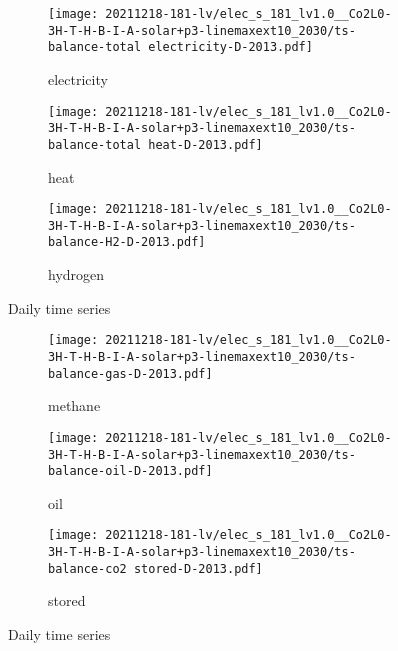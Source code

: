 \begin{figure}
    \centering
    \begin{subfigure}[t]{\textwidth}
        \centering
        \caption{electricity}
        \texttt{[image: 20211218-181-lv/elec\_s\_181\_lv1.0\_\_Co2L0-3H-T-H-B-I-A-solar+p3-linemaxext10\_2030/ts-balance-total electricity-D-2013.pdf]}
    \end{subfigure}
    \begin{subfigure}[t]{\textwidth}
        \centering
        \caption{heat}
        \texttt{[image: 20211218-181-lv/elec\_s\_181\_lv1.0\_\_Co2L0-3H-T-H-B-I-A-solar+p3-linemaxext10\_2030/ts-balance-total heat-D-2013.pdf]}
    \end{subfigure}
    \begin{subfigure}[t]{\textwidth}
        \centering
        \caption{hydrogen}
        \texttt{[image: 20211218-181-lv/elec\_s\_181\_lv1.0\_\_Co2L0-3H-T-H-B-I-A-solar+p3-linemaxext10\_2030/ts-balance-H2-D-2013.pdf]}
    \end{subfigure}
    \caption{Daily time series}
    \label{fig:eligibility}
\end{figure}

\begin{figure}
    \centering
    \begin{subfigure}[t]{\textwidth}
        \centering
        \caption{methane}
        \texttt{[image: 20211218-181-lv/elec\_s\_181\_lv1.0\_\_Co2L0-3H-T-H-B-I-A-solar+p3-linemaxext10\_2030/ts-balance-gas-D-2013.pdf]}
    \end{subfigure}
    \begin{subfigure}[t]{\textwidth}
        \centering
        \caption{oil}
        \texttt{[image: 20211218-181-lv/elec\_s\_181\_lv1.0\_\_Co2L0-3H-T-H-B-I-A-solar+p3-linemaxext10\_2030/ts-balance-oil-D-2013.pdf]}
    \end{subfigure}
    \begin{subfigure}[t]{\textwidth}
        \centering
        \caption{stored \co}
        \texttt{[image: 20211218-181-lv/elec\_s\_181\_lv1.0\_\_Co2L0-3H-T-H-B-I-A-solar+p3-linemaxext10\_2030/ts-balance-co2 stored-D-2013.pdf]}
    \end{subfigure}
    \caption{Daily time series}
    \label{fig:eligibility}
\end{figure}


